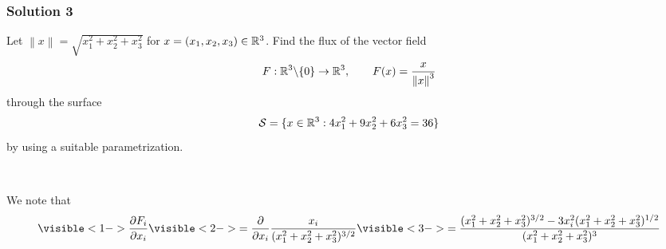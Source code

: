 \documentclass[10pt, t, allowdisplaybreaks]{beamer}
\newcommand{\nullspacesmall}{~\vspace{1em}}
\begin{document}
\begin{frame}
    \frametitle{Solution 3}
    \par Let $\left\lVert x\right\rVert = \sqrt{x_1^2+x_2^2+x_3^2}$ for $x = (x_1, x_2, x_3) \in \mathbb{R}^3$. Find the flux of the vector field
    \begin{equation*}
        F:\mathbb{R}^3\backslash\{0\}\rightarrow\mathbb{R}^3, \qquad F(x) = \frac{x}{\left\lVert x\right\rVert^3 }
    \end{equation*}
    through the surface
    \begin{equation*}
        \mathcal{S} = \{x\in \mathbb{R}^3: 4x_1^2 + 9x_2^2 + 6x_3^2 = 36\}
    \end{equation*}
    by using a suitable parametrization.

    \nullspacesmall

    \par We note that
    \begin{equation*}
        \visible<1->{
            \frac{\partial F_i}{\partial x_i}
        }
        \visible<2->{
            = \frac{\partial }{\partial x_i}\frac{x_i}{(x_1^2+x_2^2+x_3^2)^{3/2}}
        }
        \visible<3->{
            = \frac{(x_1^2+x_2^2+x_3^2)^{3/2} - 3x_i^2(x_1^2+x_2^2+x_3^2)^{1/2}}{(x_1^2+x_2^2+x_3^2)^{3}}
        }
    \end{equation*}
\end{frame}
\end{document}
